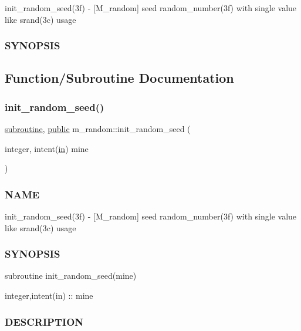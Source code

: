 \begin{DoxyCompactItemize}
\begin{DoxyCompactList}
init\+\_\+random\+\_\+seed(3f) -\/ \mbox{[}M\+\_\+random\mbox{]} seed random\+\_\+number(3f) with single value like srand(3c) usage \subsubsection*{S\+Y\+N\+O\+P\+S\+IS}\end{DoxyCompactList}\end{DoxyCompactItemize}


\subsection{Function/\+Subroutine Documentation}
\mbox{\label{namespacem__random_af867f4abf9b4006b89e0ca160fc1b61a}} 
\subsubsection{\texorpdfstring{init\+\_\+random\+\_\+seed()}{init\_random\_seed()}}
{\footnotesize\ttfamily \hyperlink{M__stopwatch_83_8txt_acfbcff50169d691ff02d4a123ed70482}{subroutine}, \hyperlink{M__stopwatch_83_8txt_a2f74811300c361e53b430611a7d1769f}{public} m\+\_\+random\+::init\+\_\+random\+\_\+seed (\begin{DoxyParamCaption}\item[{integer, intent(\hyperlink{M__journal_83_8txt_afce72651d1eed785a2132bee863b2f38}{in})}]{mine }\end{DoxyParamCaption})}



\subsubsection*{N\+A\+ME}

init\+\_\+random\+\_\+seed(3f) -\/ \mbox{[}M\+\_\+random\mbox{]} seed random\+\_\+number(3f) with single value like srand(3c) usage \subsubsection*{S\+Y\+N\+O\+P\+S\+IS}

subroutine init\+\_\+random\+\_\+seed(mine)

integer,intent(in) \+:\+: mine \subsubsection*{D\+E\+S\+C\+R\+I\+P\+T\+I\+ON}

